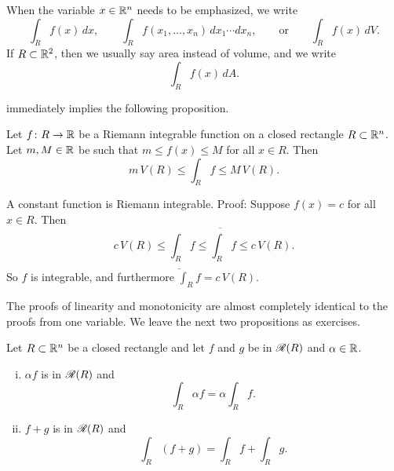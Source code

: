 When the variable $x \in {\mathbb{R}}^n$ needs to be emphasized, we write
\begin{equation*}
\int_R f(x)\,dx,
\qquad
\int_R f(x_1,\ldots,x_n)\,dx_1 \cdots dx_n,
\qquad
\text{or}
\qquad
\int_R f(x)\,dV .
\end{equation*}
If $R \subset {\mathbb{R}}^2$, then we usually say area instead of volume, and we
write
\begin{equation*}
\int_R f(x)\,dA .
\end{equation*}

 immediately implies the following
proposition.

\begin{prop} \label{mv:intbound:prop}
Let $f \colon R \to {\mathbb{R}}$ be a Riemann integrable function
on a closed rectangle $R \subset {\mathbb{R}}^n$.
Let $m, M \in {\mathbb{R}}$ be 
such that $m \leq f(x) \leq M$ for all $x \in R$.  Then
\begin{equation*}
m \, V(R) \leq
\int_{R} f
\leq M \, V(R) .
\end{equation*}
\end{prop}

\begin{example}
A constant function is Riemann integrable.  Proof: Suppose
$f(x) = c$ for all $x \in R$.  Then
\begin{equation*}
c \, V(R) \leq \underline{\int_R} f \leq \overline{\int_R} f \leq c\, V(R) .
\end{equation*}
So $f$ is integrable, and furthermore $\int_R f = c\,V(R)$.
\end{example}

The proofs of linearity and monotonicity are almost completely identical to
the proofs from one variable.
We leave the next two propositions as exercises.

\begin{samepage}
\begin{prop}[Linearity] \label{mv:intlinearity:prop}
Let $R \subset {\mathbb{R}}^n$ be a closed rectangle and let
$f$ and $g$ be in ${\mathscr{R}}(R)$ and $\alpha \in {\mathbb{R}}$.
\begin{enumerate}[(i)]
\item $\alpha f$ is in ${\mathscr{R}}(R)$ and
\begin{equation*}
\int_R \alpha f = \alpha \int_R f .
\end{equation*}
\item $f+g$ is in ${\mathscr{R}}(R)$ and
\begin{equation*}
\int_R (f+g) = 
\int_R f
+
\int_R g .
\end{equation*}
\end{enumerate}
\end{prop}
\end{samepage}


